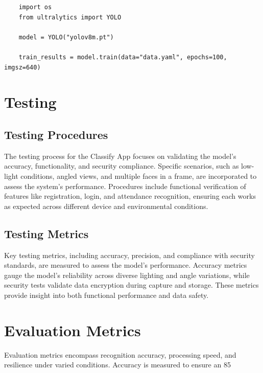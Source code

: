 \begin{verbatim}
    import os
    from ultralytics import YOLO

    model = YOLO("yolov8m.pt")
    
    train_results = model.train(data="data.yaml", epochs=100, imgsz=640)
\end{verbatim}

\section{Testing}
\subsection{Testing Procedures}
The testing process for the Classify App focuses on validating the model’s accuracy, functionality, and security compliance. Specific scenarios, such as low-light conditions, angled views, and multiple faces in a frame, are incorporated to assess the system’s performance. Procedures include functional verification of features like registration, login, and attendance recognition, ensuring each works as expected across different device and environmental conditions.

\subsection{Testing Metrics}
Key testing metrics, including accuracy, precision, and compliance with security standards, are measured to assess the model's performance. Accuracy metrics gauge the model’s reliability across diverse lighting and angle variations, while security tests validate data encryption during capture and storage. These metrics provide insight into both functional performance and data safety.

\section{Evaluation Metrics}
Evaluation metrics encompass recognition accuracy, processing speed, and resilience under varied conditions. Accuracy is measured to ensure an 85%


